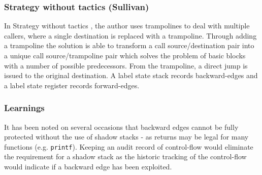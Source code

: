 \subsubsection{Strategy without tactics (Sullivan)}
In Strategy without tactics \cite{Davi2015}, the author uses trampolines to deal with multiple callers, where a single destination is replaced with a trampoline. Through adding a trampoline the solution is able to transform a call source\slash destination pair into a unique call source\slash trampoline pair which solves the problem of basic blocks with a number of possible predecessors. From the trampoline, a direct jump is issued to the original destination. A label state stack records backward-edges and a label state register records forward-edges. 

\subsubsection{Learnings}
It has been noted on several occasions that backward edges cannot be fully protected without the use of shadow stacks - as returns may be legal for many functions (e.g. \verb|printf|). Keeping an audit record of control-flow would eliminate the requirement for a shadow stack as the historic tracking of the control-flow would indicate if a backward edge has been exploited.